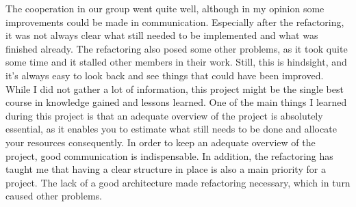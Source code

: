 The cooperation in our group went quite well, although in my opinion some improvements could be made in communication. Especially after the refactoring, it was not always clear what still needed to be implemented and what was finished already. The refactoring also posed some other problems, as it took quite some time and it stalled other members in their work. Still, this is hindsight, and it's always easy to look back and see things that could have been improved.\\

While I did not gather a lot of information, this project might be the single best course in knowledge gained and lessons learned. One of the main things I learned during this project is that an adequate overview of the project is absolutely essential, as it enables you to estimate what still needs to be done and allocate your resources consequently. In order to keep an adequate overview of the project, good communication is indispensable. In addition, the refactoring has taught me that having a clear structure in place is also a main priority for a project. The lack of a good architecture made refactoring necessary, which in turn caused other problems.\\